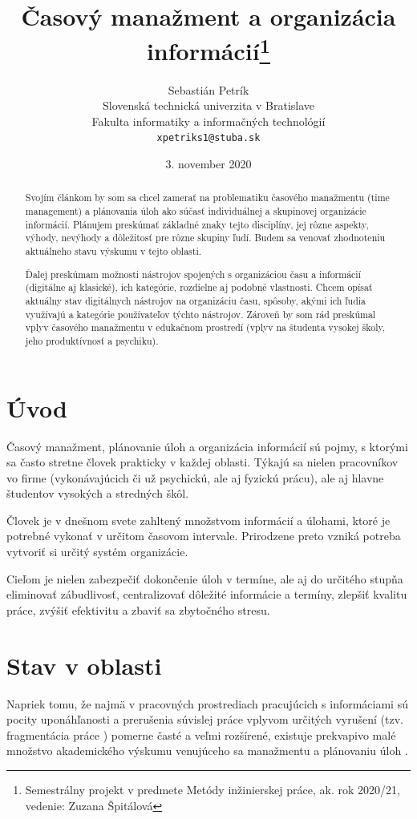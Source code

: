 \documentclass[10pt,slovak,a4paper]{article}
\title{Časový manažment a organizácia informácií\thanks{Semestrálny projekt v predmete Metódy inžinierskej práce, ak. rok 2020/21, vedenie: Zuzana Špitálová}}
\author{Sebastián Petrík\\[2pt]
	{\small Slovenská technická univerzita v Bratislave}\\
	{\small Fakulta informatiky a informačných technológií}\\
	{\small \texttt{xpetriks1@stuba.sk}}
	}
\date{\small 3. november 2020}
\begin{document}
\maketitle

\begin{abstract}
Svojím článkom by som sa chcel zamerať na problematiku časového manažmentu (time management) a plánovania úloh ako súčasť individuálnej a skupinovej organizácie informácií. Plánujem preskúmať základné znaky tejto disciplíny, jej rôzne aspekty, výhody, nevýhody a dôležitosť pre rôzne skupiny ľudí. Budem sa venovať zhodnoteniu aktuálneho stavu výskumu v tejto oblasti.

Ďalej preskúmam možnosti nástrojov spojených s organizáciou času a informácií (digitálne aj klasické), ich kategórie, rozdielne aj podobné vlastnosti. Chcem opísať aktuálny stav digitálnych nástrojov na organizáciu času, spôsoby, akými ich ľudia využívajú a kategórie používateľov týchto nástrojov. Zároveň by som rád preskúmal vplyv časového manažmentu v edukačnom prostredí (vplyv na študenta vysokej školy, jeho produktívnosť a psychiku).

\end{abstract}
\newpage

\section{Úvod}

	Časový manažment, plánovanie úloh a organizácia informácií sú pojmy, s ktorými sa často stretne človek prakticky v každej oblasti. Týkajú sa nielen pracovníkov vo firme (vykonávajúcich či už psychickú, ale aj fyzickú prácu), ale aj hlavne študentov vysokých a stredných škôl.
	
	Človek je v dnešnom svete zahltený množstvom informácií a úlohami, ktoré je potrebné vykonať v určitom časovom intervale. Prirodzene preto vzniká potreba vytvoriť si určitý systém organizácie.
	
	Cieľom je nielen zabezpečiť dokončenie úloh v termíne, ale aj do určitého stupňa eliminovať zábudlivosť, centralizovať dôležité informácie a termíny, zlepšiť kvalitu práce, zvýšiť efektivitu a zbaviť sa zbytočného stresu.
	
\section{Stav v oblasti}

	Napriek tomu, že najmä v pracovných prostrediach pracujúcich s informáciami sú pocity uponáhľanosti a prerušenia súvislej práce vplyvom určitých vyrušení (tzv. fragmentácia práce \cite{NoTask}) pomerne časté a veľmi rozšírené, existuje prekvapivo malé množstvo akademického výskumu venujúceho sa manažmentu a plánovaniu úloh \cite{Franssila}. 
	
\end{document}
